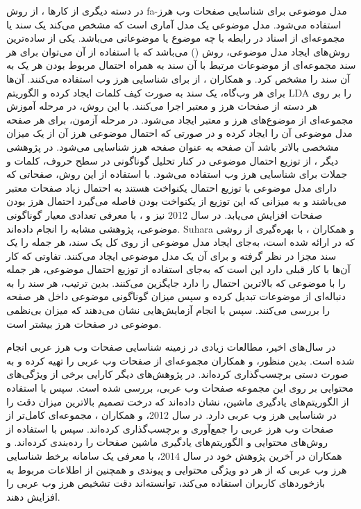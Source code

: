 \documentclass[twoside, a4paper,11pt]{book}
\numberwithin{equation}{chapter}
\numberwithin{table}{chapter}
\numberwithin{figure}{chapter}
\numberwithin{equation}{chapter}
\newcommand{\mls}[1]{\gls{fa-#1}\glsuseri{la-#1}}
\begin{document}
در دسته دیگری از کارها \cite{Biro:2008,pavlov2011detecting,dong2012effectively,suhara2013automatically}، از روش \mls{مدل موضوعی} برای شناسایی صفحات وب هرز استفاده می‌شود. مدل موضوعی یک مدل آماری است که مشخص می‌کند یک سند یا مجموعه‌ای از اسناد در رابطه با چه موضوع یا موضوعاتی می‌باشد. یکی از ساده‌ترین روش‌های ایجاد مدل موضوعی، روش  () \cite{blei2003latent} می‌باشد که با استفاده از آن می‌توان برای هر سند مجموعه‌ای از موضوعات مرتبط با آن سند به همراه احتمال مربوط بودن هر یک به آن سند را مشخص کرد.  و همکاران \cite{Biro:2008}، از  برای شناسایی هرز وب استفاده می‌کنند. آن‌ها برای هر وب‌گاه، یک سند به صورت کیف کلمات ایجاد کرده و الگوریتم LDA را بر روی هر دسته از صفحات هرز و معتبر اجرا می‌کنند. با این روش، در مرحله آموزش مجموعه‌ای از موضوع‌های هرز و معتبر ایجاد می‌شود. در مرحله آزمون، برای هر صفحه مدل موضوعی آن را ایجاد کرده و در صورتی ‌که احتمال موضوعی هرز آن از یک میزان مشخصی بالاتر باشد آن صفحه به عنوان صفحه هرز شناسایی می‌شود. در پژوهشی دیگر \cite{pavlov2011detecting}، از توزیع احتمال موضوعی در کنار تحلیل گوناگونی در سطح حروف، کلمات و جملات برای شناسایی هرز وب استفاده می‌شود. با استفاده از این روش، صفحاتی که دارای مدل موضوعی با توزیع احتمال یکنواخت هستند به احتمال زیاد صفحات معتبر می‌باشند و به میزانی که این توزیع از یکنواخت بودن فاصله می‌گیرد احتمال هرز بودن صفحات افزایش می‌یابد. در سال 2012 نیز  و  \cite{dong2012effectively}، با معرفی تعدادی معیار گوناگونی موضوعی، پژوهشی مشابه \cite{pavlov2011detecting} را انجام داده‌اند. Suhara و همکاران \cite{suhara2013automatically}، با بهره‌گیری از روشی که در \cite{riedl2012sweeping} ارائه شده است، به‌جای ایجاد مدل موضوعی از روی کل یک سند، هر جمله را یک سند مجزا در نظر گرفته و برای آن یک مدل موضوعی ایجاد می‌کنند. تفاوتی که کار آن‌ها با کار قبلی دارد این است که به‌جای استفاده از توزیع احتمال موضوعی، هر جمله را با موضوعی که بالاترین احتمال را دارد جایگزین می‌کنند. بدین ترتیب، هر سند را به دنباله‌ای از موضوعات تبدیل کرده و سپس میزان گوناگونی موضوعی داخل هر صفحه را بررسی می‌کنند. سپس با انجام آزمایش‌هایی نشان می‌دهند که میزان بی‌نظمی موضوعی در صفحات هرز بیشتر است.

در سال‌های اخیر، مطالعات زیادی در زمینه شناسایی صفحات وب هرز عربی انجام شده ‌است. بدین منظور،  و همکاران \cite{wahsheh2011detecting} مجموعه‌ای از صفحات وب عربی را تهیه کرده‌ و به صورت دستی برچسب‌گذاری کرده‌اند. در پژوهش‌های دیگر \cite{jaramh2011detecting,al2011combating} کارایی برخی از ویژگی‌های محتوایی بر روی این مجموعه صفحات وب عربی، بررسی شده است. سپس با استفاده از الگوریتم‌های یادگیری ماشین، نشان داده‌اند که درخت تصمیم بالاترین میزان دقت را در شناسایی هرز وب عربی دارد. در سال 2012،  و همکاران \cite{al2012content}، مجموعه‌ای کامل‌تر از صفحات وب هرز عربی را جمع‌آوری و برچسب‌گذاری کرده‌اند. سپس با استفاده از روش‌های محتوایی و الگوریتم‌های یادگیری ماشین صفحات را رده‌بندی کرده‌اند.  و همکاران \cite{al2014olawsds} در آخرین پژوهش خود در سال 2014، با معرفی یک سامانه بر‌خط شناسایی هرز وب عربی که از هر دو ویژگی محتوایی و پیوندی و همچنین از اطلاعات مربوط به بازخوردهای کاربران استفاده می‌کند، توانسته‌اند دقت تشخیص هرز وب عربی را افزایش دهند.
\end{document}
